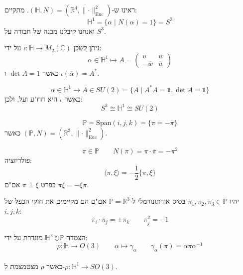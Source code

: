 \documentclass{tstextbook}
\begin{document}
\begin{corollary}
ראינו ש-\((\mathbb{H},N)=(\mathbb{R}^{4},\lVert \cdot \rVert_{\text{Euc}}^{2})\). מתקיים:
$$\mathbb{H} ^{1}=\{ \alpha \mid N(\alpha)=1 \}=S^{3}$$
ואנחנו קיבלנו מבנה של חבורה על \(S^{3}\).

\end{corollary}
\begin{proposition}
ניתן לשכן \(\iota:\mathbb{H}\to M_{2}(\mathbb{C})\) על ידי:
$$\alpha \in \mathbb{H} ^{1}\mapsto A = \begin{pmatrix}u & w \\-\overline{w}  & \overline{u} 
\end{pmatrix}$$
כאשר \(\det A=1\) ו-\(\iota(\overline{\alpha})=A^{*}\).

\end{proposition}
\begin{proposition}[שיכון \(S^{3}\) ב-\(SU(2)\)]
$$\alpha \in \mathbb{H} ^{1}\to A \in SU(2)=\{ A\mid  A^{*}A=\mathbb{1} ,\det A=\mathbb{1}  \}$$
כאשר \(\iota\) היא חח"ע ועל, ולכן:
$$S^{3}\cong  \mathbb{H} ^{1}\cong  SU(2)$$

\end{proposition}
\begin{proposition}
$$\mathbb{P} =\mathrm{Span}(i,j,k)=\{ \pi=-\overline{\pi}  \}$$
כאשר \((\mathbb{P} ,N)=(\mathbb{R} ^{3},\lVert \cdot \rVert ^{2}_{\text{Euc}})\).

\end{proposition}
\begin{proposition}
$$\pi \in \mathbb{P} \qquad N(\pi)=\pi \cdot \overline{\pi} =-\pi^{2}$$
פולריזציה:
$$\langle \pi,\xi \rangle =-\frac{1}{2}\{ \pi,\xi \}$$
בפרט \(\pi \perp \xi\) אם"ם \(\pi \xi=-\xi \pi\).

\end{proposition}
\begin{proposition}
יהיו \(\pi_{1},\pi_{2},\pi_{3}\in \mathbb{P}\) בסיס אורתונורמלי ל-\(\mathbb{P}=\mathbb{R}^{3}\) אם"ם הם מקיימים את חוקי הכפל של \(i,j,k\):
$$\pi_{i}\cdot \pi_{j}=\pm \pi_{k}\qquad \pi_{j}^{2}=-1$$

\end{proposition}
\begin{definition}
הצמדה \(\mathbb{H}^{\times}\circlearrowright \mathbb{P}\) מוגדרת על ידי:
$$\rho:\mathbb{H} \to O(3)\qquad \alpha \mapsto \gamma_{\alpha}\qquad \gamma_{\alpha}(\pi)=\alpha   \pi \alpha ^{-1}$$\\

כאשר \(\rho\) מצטמצמת ל-\(\rho:\mathbb{H}^{1}\to SO(3)\).

\end{definition}
\end{document}

